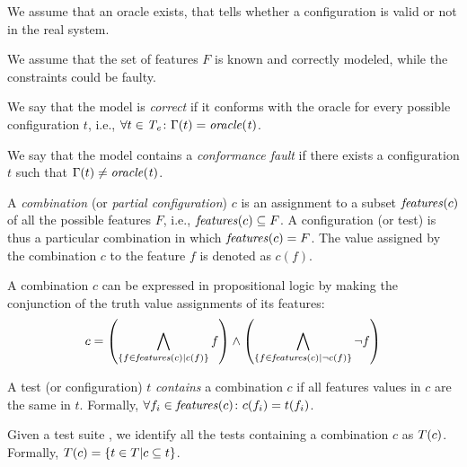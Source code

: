 \begin{tikzborder}{\cite{Gargantini16:validation}}
\begin{tikzborder}{\cite{gargantini_combinatorial_2017}}
\begin{tikzborder}{\cite{garn2019}}
\begin{tikzborder}{\cite{arcaini2019achieving}}
\begin{tikzborder}{\cite{arcaini2019varivolution}}
		We assume that an oracle exists, that tells whether a configuration is valid or not in the real system.
		
		We assume that the set of features $F$ is known and correctly modeled, while the constraints could be faulty.
		
		\begin{mydef}\label{def:varivolution_correctness}
			We say that the model \m is \emph{correct} if it conforms with the oracle for every possible configuration $t$, i.e., $\forall t \in \mathit{T_e} \colon \Gamma(t) = \mathit{oracle(t)}$. 
		\end{mydef}
		
		\begin{mydef}\label{def:conformanceFault}
			We say that the model contains a \emph{conformance fault} if there exists a configuration $t$ such that $\Gamma(t) \neq \mathit{oracle(t)}$.
		\end{mydef}
		
		\begin{mydef}[Combination]\label{def:combination1}
			A \emph{combination} (or \emph{partial configuration}) $c$ is an assignment to a subset $\mathit{features}(c)$ of all the possible features $F$, i.e., $\mathit{features}(c) \subseteq F$. A configuration (or test) is thus a particular combination in which $\mathit{features}(c)=F$. The value assigned by the combination $c$ to the feature $f$ is denoted as $c(f)$.
		\end{mydef}
		
		\begin{mydef}
			A combination $c$ can be expressed in propositional logic by making the conjunction of the truth value assignments of its features:
			\[c = \left(\bigwedge_{\{f \in \mathit{features}(c) | c(f) \}} f\right) \wedge \left(\bigwedge_{\{f \in \mathit{features}(c) | \neg c(f) \}} \neg f\right)\]
		\end{mydef}
		
		\begin{mydef}\label{def:combContainment1}
			A test (or configuration) $t$ \emph{contains} a combination $c$ if all features values in $c$ are the same in $t$. Formally, $\forall f_i \in \mathit{features}(c) \colon c(f_i) = t(f_i)$.
			
			Given a test suite \testSuite, we identify all the tests containing a combination $c$ as $T(c)$. Formally, $T(c) = \{t \in T | c \subseteq t\}$.
		\end{mydef}
		

\end{tikzborder}
\end{tikzborder}
\end{tikzborder}
\end{tikzborder}
\end{tikzborder}
